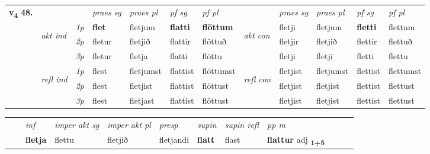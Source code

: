 \begin{tabular}{llllllllllll} \toprule
\multirow{4}{*}{{{\textbf{v{\textsubscript{4}}} \Large{\textbf{48.}}}}}  & &   &  \textit{praes sg}  & \textit{praes pl}  &\textit{ pf sg} & \textit{pf pl} &  &  \textit{praes sg}  & \textit{praes pl}  & \textit{pf sg} & \textit{pf pl } \\*
	\cmidrule{4-7} \cmidrule{9-12}
 & \multirow{3}{*}{\begin{turn}{90}\textit{akt ind}\end{turn}} & {\textit{1p}} & \textbf{flet} & fletjum    & \textbf{flatti} & \textbf{flöttum} & \multirow{3}{*}{\begin{turn}{90}\textit{akt con}\end{turn}} &fletji & fletjum & \textbf{fletti} & flettum\\*
& &  {\textit{2p}} &  fletur  & fletjið   & flattir & flöttuð & & fletjir & fletjið & flettir & flettuð \\*
& &  {\textit{3p}} & fletur & fletja   & flatti & flöttu & & fletji & fletji& fletti & flettu  \\*
\cmidrule{4-7} \cmidrule{9-12}
 &\multirow{3}{*}{\begin{turn}{90}\textit{refl ind}\end{turn}} & {\textit{1p}} & flest & fletjumst    & flattist & flöttumst & \multirow{3}{*}{\begin{turn}{90}\textit{refl con}\end{turn}}  &fletjist & fletjumst & flettist & flettumst\\*
 &&  {\textit{2p}} &  flest  & fletjist   & flattist & flöttust & &fletjist & fletjist & flettist & flettust \\*
& &  {\textit{3p}} & flest & fletjast   & flattist & flöttust & & fletjist & fletjist& flettist & flettust  \\*
\cmidrule{4-7} \cmidrule{9-12}
\end{tabular}


\begin{tabular}{llllllllllll}
 & & \textit{inf} & \textit{imper akt sg} & \textit{imper akt pl}   & \textit{presp} & \textit{supin} & \textit{supin refl} & \textit{pp m}     \\*
  & & \textbf{fletja} & flettu  & fletjið   & fletjandi &  \textbf{flatt} & flast & \textbf{flattur} adj \textbf{\textsubscript{1+5}} \\*
\cmidrule{1-12}
\end{tabular}



